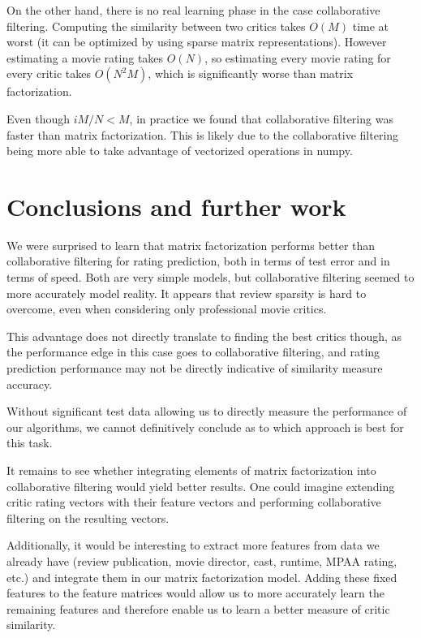 \documentclass[10.5pt]{article}
\begin{document}
On the other hand, there is no real learning phase in the case collaborative
filtering. Computing the similarity between two critics takes $O(M)$ time at
worst (it can be optimized by using sparse matrix representations). However
estimating a movie rating takes $O(N)$, so estimating every movie rating for
every critic takes $O(N^2M)$, which is significantly worse than matrix
factorization.

Even though $iM/N < M$, in practice we found that collaborative filtering was
faster than matrix factorization. This is likely due to the collaborative
filtering being more able to take advantage of vectorized operations in numpy.

\section{Conclusions and further work}

We were surprised to learn that matrix factorization performs better than
collaborative filtering for rating prediction, both in terms of test error and
in terms of speed. Both are very simple models, but collaborative filtering
seemed to more accurately model reality. It appears that review sparsity is
hard to overcome, even when considering only professional movie critics.

This advantage does not directly translate to finding the best critics though,
as the performance edge in this case goes to collaborative filtering, and 
rating prediction performance may not be directly indicative of similarity
measure accuracy.

Without significant test data allowing us to directly measure the performance
of our algorithms, we cannot definitively conclude as to which approach is best
for this task.

It remains to see whether integrating elements of matrix factorization into
collaborative filtering would yield better results. One could imagine extending
critic rating vectors with their feature vectors and performing collaborative
filtering on the resulting vectors.

Additionally, it would be interesting to extract more features from data we
already
have (review publication, movie director, cast, runtime, MPAA rating, etc.) and
integrate them in our matrix factorization model. Adding these fixed features
to the feature matrices would allow us to more accurately learn the remaining
features and therefore enable us to learn a better measure of critic
similarity.

{}

\end{document}
